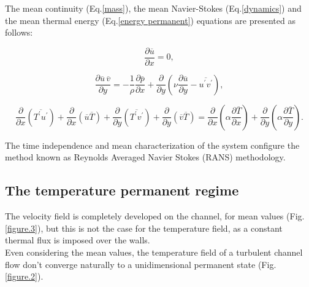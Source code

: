 \documentclass[10pt]{article} %
\begin{document}
The mean continuity (Eq.\ref{mass}), the mean Navier-Stokes (Eq.\ref{dynamics}) and the mean thermal energy (Eq.\ref{energy permanent}) equations are presented as follows: 


\begin{equation}\label{mass}
\frac{\partial \overline{u}}{\partial x} = 0,
\end{equation}

\begin{equation}\label{dynamics}
\frac{\partial \overline{u} \, \overline{v}}{\partial y} = 
- \frac{1}{\rho} \frac{\partial \overline{p}}{\partial x} + \frac{\partial}{\partial y}\left(\nu \frac{\partial \overline{u}}{\partial y} - \overline{u^\prime v^\prime}\right),
\end{equation}


\begin{equation}\label{energy permanent}
\frac{\partial{}}{\partial{x}} \left(\overline{T^\prime u^\prime}\right) + \frac{\partial{}}{\partial{x}}\left(\overline{u} \overline{T}\right)     + 
\frac{\partial{}}{\partial{y}} \left(\overline{T^\prime v^\prime}\right) + \frac{\partial{}}{\partial{y}}\left(\overline{v} \overline{T}\right) 
=
{\frac{\partial{}}{\partial{x}}} \left(\alpha {\frac{\partial{\overline{T}}}{\partial{x}}} \right) +
{\frac{\partial{}}{\partial{y}}} \left(\alpha {\frac{\partial{\overline{T}}}{\partial{y}}} \right). 
\end{equation}


The time independence and mean characterization of the system configure the method known as Reynolds Averaged Navier Stokes (RANS) methodology.

\subsection{The temperature permanent regime}

The velocity field is completely developed on the channel, for mean values (Fig. \ref{figure.3}), but this is not the case for the temperature field, as a constant thermal flux is imposed over the walls.\\
Even considering the mean values, the temperature field of a turbulent channel flow don't converge naturally to a unidimensional permanent state (Fig. \ref{figure.2}).
\end{document}

